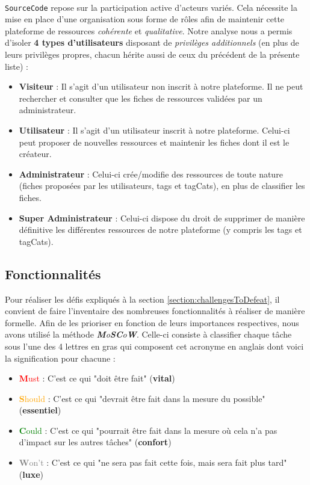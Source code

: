 \paragraph{} \texttt{SourceCode} repose sur la participation active d'acteurs variés. Cela nécessite la mise en place d'une organisation sous forme de rôles afin de maintenir cette plateforme de ressources \textit{cohérente} et \textit{qualitative}. Notre analyse nous a permis d'isoler \textbf{4 types d'utilisateurs} disposant de \textit{privilèges additionnels} (en plus de leurs privilèges propres, chacun hérite aussi de ceux du précédent de la présente liste) :

\begin{itemize}
    \item \textbf{Visiteur} : Il s'agit d'un utilisateur non inscrit à notre plateforme. Il ne peut rechercher et consulter que les \glspl{fiche} de ressources validées par un administrateur.
    \item \textbf{Utilisateur} : Il s'agit d'un utilisateur  inscrit à notre plateforme. Celui-ci peut proposer de nouvelles ressources et maintenir les \glspl{fiche} dont il est le créateur.
    \item \textbf{Administrateur} : Celui-ci crée/modifie des ressources de toute nature (\glspl{fiche} proposées par les utilisateurs, \glspl{tag} et \glspl{tagCat}), en plus de classifier les \glspl{fiche}.
    \item \textbf{Super Administrateur} : Celui-ci dispose du droit de supprimer de manière définitive les différentes ressources de notre plateforme (y compris les \glspl{tag} et \glspl{tagCat}).
\end{itemize}

\subsection*{Fonctionnalités}

Pour réaliser les défis expliqués à la section \ref{section:challengesToDefeat}, il convient de faire l'inventaire des nombreuses fonctionnalités à réaliser de manière formelle.
Afin de les prioriser en fonction de leurs importances respectives, nous avons utilisé la méthode \textit{\textbf{M}o\textbf{S}\textbf{C}o\textbf{W}}\cite{MoSCoW}. Celle-ci consiste à classifier chaque tâche sous l'une des 4 lettres en gras qui composent cet acronyme en anglais dont voici la signification pour chacune :
\begin{itemize}
    \item \textcolor{red}{\textbf{M}ust} : C'est ce qui "doit être fait" (\textbf{vital})
    \item \textcolor{orange}{\textbf{S}hould} : C'est ce qui "devrait être fait dans la mesure du possible" (\textbf{essentiel})
    \item \textcolor{green}{\textbf{C}ould} : C'est ce qui "pourrait être fait dans la mesure où cela n'a pas d'impact sur les autres tâches" (\textbf{confort})
    \item \textcolor{gray}{\textbf{W}on't} : C'est ce qui "ne sera pas fait cette fois, mais sera fait plus tard" (\textbf{luxe})
\end{itemize}

